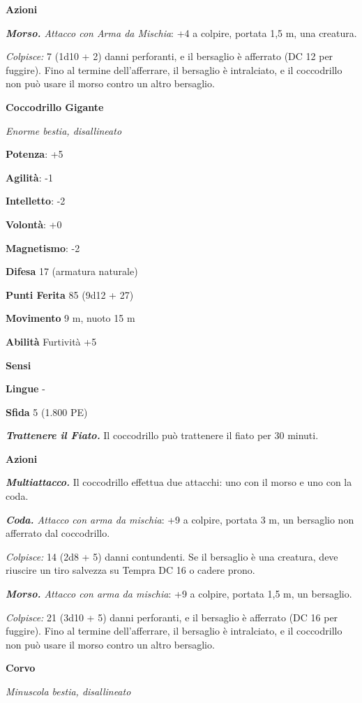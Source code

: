 \begin{multicols}{2}
\textbf{Azioni}

\emph{\textbf{Morso.} Attacco con Arma da Mischia}: +4 a colpire,
portata 1,5 m, una creatura.

\emph{Colpisce:} 7 (1d10 + 2) danni perforanti, e il bersaglio è
afferrato (DC 12 per fuggire). Fino al termine dell'afferrare, il
bersaglio è intralciato, e il coccodrillo non può usare il morso contro
un altro bersaglio.

\textbf{Coccodrillo Gigante}

\emph{Enorme bestia, disallineato}

\textbf{Potenza}: +5

\textbf{Agilità}: -1

\textbf{Intelletto}: -2

\textbf{Volontà}: +0

\textbf{Magnetismo}: -2

\textbf{Difesa} 17 (armatura naturale)

\textbf{Punti Ferita} 85 (9d12 + 27)

\textbf{Movimento} 9 m, nuoto 15 m

\textbf{Abilità} Furtività +5

\textbf{Sensi} 

\textbf{Lingue} -

\textbf{Sfida} 5 (1.800 PE)

\emph{\textbf{Trattenere il Fiato.}} Il coccodrillo può trattenere il
fiato per 30 minuti.

\textbf{Azioni}

\emph{\textbf{Multiattacco.}} Il coccodrillo effettua due attacchi: uno
con il morso e uno con la coda.

\emph{\textbf{Coda.} Attacco con arma da mischia}: +9 a colpire, portata
3 m, un bersaglio non afferrato dal coccodrillo.

\emph{Colpisce:} 14 (2d8 + 5) danni contundenti. Se il bersaglio è una
creatura, deve riuscire un tiro salvezza su Tempra DC 16 o cadere prono.

\emph{\textbf{Morso.} Attacco con arma da mischia}: +9 a colpire,
portata 1,5 m, un bersaglio.

\emph{Colpisce:} 21 (3d10 + 5) danni perforanti, e il bersaglio è
afferrato (DC 16 per fuggire). Fino al termine dell'afferrare, il
bersaglio è intralciato, e il coccodrillo non può usare il morso contro
un altro bersaglio.

\textbf{Corvo}

\emph{Minuscola bestia, disallineato}


\end{multicols}
